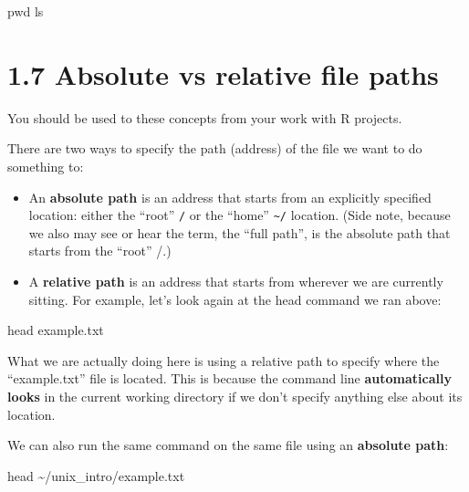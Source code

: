 \documentclass[
]{book}
\newenvironment{Shaded}{\begin{snugshade}}{\end{snugshade}}
\newcommand{\BuiltInTok}[1]{#1}
\newcommand{\FunctionTok}[1]{\textcolor[rgb]{0.00,0.00,0.00}{#1}}
\newcommand{\NormalTok}[1]{#1}
\begin{document}
\begin{Shaded}
\begin{Highlighting}[]
    \BuiltInTok{pwd}
    \FunctionTok{ls}
\end{Highlighting}
\end{Shaded}

\hypertarget{absolute-vs-relative-file-paths}{%
\section{1.7 Absolute vs relative file paths}\label{absolute-vs-relative-file-paths}}

You should be used to these concepts from your work with R projects.

There are two ways to specify the path (address) of the file we want to do something to:

\begin{itemize}
\item
  An \textbf{absolute path} is an address that starts from an explicitly specified location: either the ``root'' \texttt{/} or the ``home'' \texttt{\textasciitilde{}/} location. (Side note, because we also may see or hear the term, the ``full path'', is the absolute path that starts from the ``root'' /.)
\item
  A \textbf{relative path} is an address that starts from wherever we are currently sitting. For example, let's look again at the head command we ran above:
\end{itemize}

\begin{Shaded}
\begin{Highlighting}[]
    \FunctionTok{head}\NormalTok{ example.txt}
\end{Highlighting}
\end{Shaded}

What we are actually doing here is using a relative path to specify where the ``example.txt'' file is located. This is because the command line \textbf{automatically looks} in the current working directory if we don't specify anything else about its location.

We can also run the same command on the same file using an \textbf{absolute path}:

\begin{Shaded}
\begin{Highlighting}[]
    \FunctionTok{head}\NormalTok{ \textasciitilde{}/unix\_intro/example.txt}
\end{Highlighting}
\end{Shaded}
\end{document}
